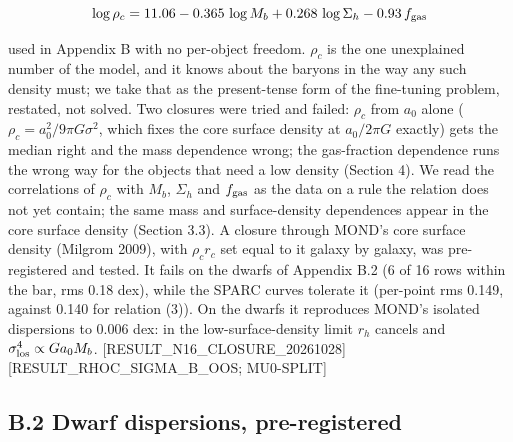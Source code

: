 \documentclass[
  10pt,
]{article}
\begin{document}
\begin{equation}
\log\rho_c = 11.06 - 0.365\,\log M_b + 0.268\,\log\Sigma_h - 0.93\,f_{\rm gas}
\end{equation}

used in Appendix B with no per-object freedom. $\rho_c$ is the one
unexplained number of the model, and it knows about the baryons in the way
any such density must; we take that as the present-tense form of the
fine-tuning problem, restated, not solved. Two closures were tried and
failed: $\rho_c$ from $a_0$ alone ($\rho_c=a_0^2/9\pi G\sigma^2$,
which fixes the core surface density at $a_0/2\pi G$ exactly) gets the
median right and the mass dependence wrong; the gas-fraction dependence
runs the wrong way for the objects that need a low density (Section 4).
We read the correlations of $\rho_c$ with $M_b$, $\Sigma_h$ and $f_{\rm gas}$ as the data on a rule the relation does not yet contain; the same mass and surface-density dependences appear in the core surface density (Section 3.3). A closure through MOND's core surface density (Milgrom 2009), with $\rho_c r_c$ set equal to it galaxy by galaxy, was pre-registered and tested. It fails on the dwarfs of Appendix B.2 (6 of 16 rows within the bar, rms 0.18 dex), while the SPARC curves tolerate it (per-point rms 0.149, against 0.140 for relation (3)). On the dwarfs it reproduces MOND's isolated dispersions to 0.006 dex: in the low-surface-density limit $r_h$ cancels and $\sigma_{\rm los}^4 \propto G a_0 M_b$. {[}RESULT\_N16\_CLOSURE\_20261028{]}
{[}RESULT\_RHOC\_SIGMA\_B\_OOS; MU0-SPLIT{]}

\subsection{B.2 Dwarf dispersions, pre-registered}
\end{document}
